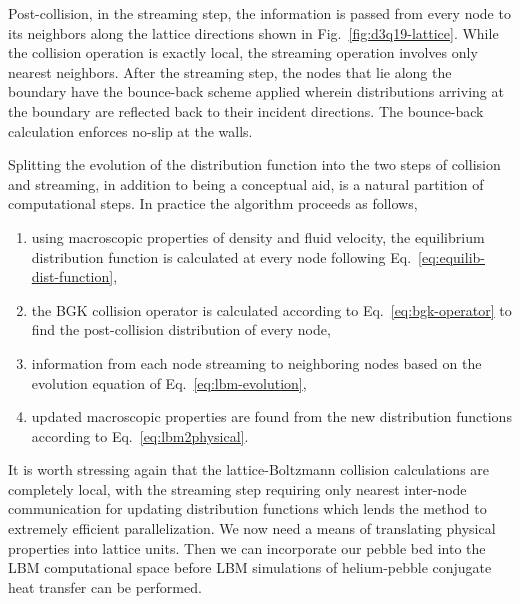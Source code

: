 Post-collision, in the streaming step, the information is passed from every node to its neighbors along the lattice directions shown in Fig.~\ref{fig:d3q19-lattice}. While the collision operation is exactly local, the streaming operation involves only nearest neighbors. After the streaming step, the nodes that lie along the boundary have the bounce-back scheme applied wherein distributions arriving at the boundary are reflected back to their incident directions. The bounce-back calculation enforces no-slip at the walls.

Splitting the evolution of the distribution function into the two steps of collision and streaming, in addition to being a conceptual aid, is a natural partition of computational steps. In practice the algorithm proceeds as follows,\cite{Viggen2009}
\begin{enumerate}
	\item{using macroscopic properties of density and fluid velocity, the equilibrium distribution function is calculated at every node following Eq.~\ref{eq:equilib-dist-function},}
	\item{the BGK collision operator is calculated according to Eq.~\ref{eq:bgk-operator} to find the post-collision distribution of every node,}
	\item{information from each node streaming to neighboring nodes based on the evolution equation of Eq.~\ref{eq:lbm-evolution},}
	\item{updated macroscopic properties are found from the new distribution functions according to Eq.~\ref{eq:lbm2physical}.}
\end{enumerate}

It is worth stressing again that the lattice-Boltzmann collision calculations are completely local, with the streaming step requiring only nearest inter-node communication for updating distribution functions which lends the method to extremely efficient parallelization. We now need a means of translating physical properties into lattice units. Then we can incorporate our pebble bed into the LBM computational space before LBM simulations of helium-pebble conjugate heat transfer can be performed.





